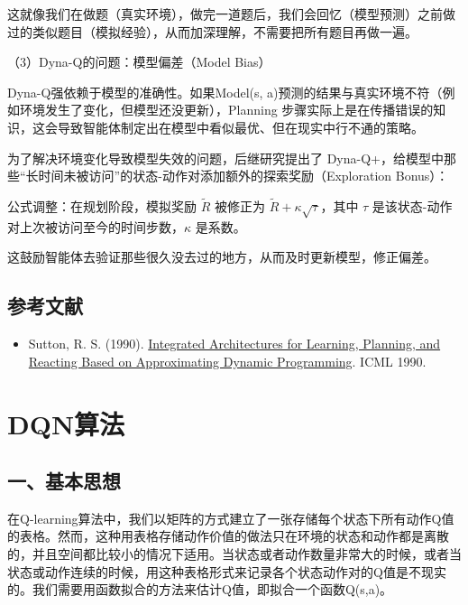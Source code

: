 这就像我们在做题（真实环境），做完一道题后，我们会回忆（模型预测）之前做过的类似题目（模拟经验），从而加深理解，不需要把所有题目再做一遍。

（3）Dyna-Q的问题：模型偏差（Model Bias）

Dyna-Q强依赖于模型的准确性。如果Model(s, a)预测的结果与真实环境不符（例如环境发生了变化，但模型还没更新），Planning 步骤实际上是在传播错误的知识，这会导致智能体制定出在模型中看似最优、但在现实中行不通的策略。

为了解决环境变化导致模型失效的问题，后继研究提出了 Dyna-Q+，给模型中那些``长时间未被访问''的状态-动作对添加额外的探索奖励（Exploration Bonus）：

公式调整：在规划阶段，模拟奖励 \(\tilde{R}\) 被修正为 \(\tilde{R}+\kappa\sqrt{\tau}\)，其中 \(\tau\) 是该状态-动作对上次被访问至今的时间步数，\(\kappa\) 是系数。

这鼓励智能体去验证那些很久没去过的地方，从而及时更新模型，修正偏差。

\hypertarget{ux53c2ux8003ux6587ux732e-47}{%
\subsection{参考文献}\label{ux53c2ux8003ux6587ux732e-47}}

\begin{itemize}
\tightlist
\item
  Sutton, R. S. (1990). \href{http://incompleteideas.net/papers/sutton-90.pdf}{Integrated Architectures for Learning, Planning, and Reacting Based on Approximating Dynamic Programming}. ICML 1990.
\end{itemize}

\clearpage

\hypertarget{dqnux7b97ux6cd5}{%
\section{DQN算法}\label{dqnux7b97ux6cd5}}

\hypertarget{ux4e00ux57faux672cux601dux60f3}{%
\subsection{一、基本思想}\label{ux4e00ux57faux672cux601dux60f3}}

在Q-learning算法中，我们以矩阵的方式建立了一张存储每个状态下所有动作Q值的表格。然而，这种用表格存储动作价值的做法只在环境的状态和动作都是离散的，并且空间都比较小的情况下适用。当状态或者动作数量非常大的时候，或者当状态或动作连续的时候，用这种表格形式来记录各个状态动作对的Q值是不现实的。我们需要用函数拟合的方法来估计Q值，即拟合一个函数Q(s,a)。

